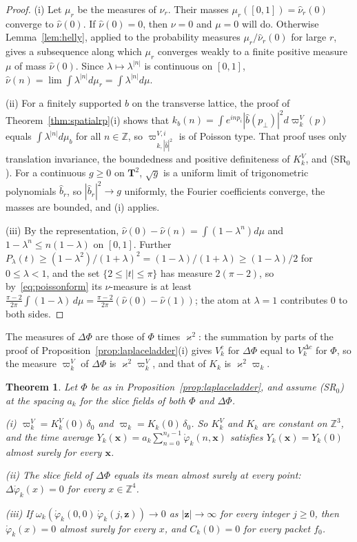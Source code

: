 \documentclass[aps,prd,twocolumn,superscriptaddress,nofootinbib,longbibliography,floatfix,amsmath,amssymb,10pt]{revtex4-2}
\newtheorem{theorem}{Theorem}
\theoremstyle{definition}
\theoremstyle{remark}
\newcommand{\Z}{\mathbb{Z}}
\begin{document}
\begin{proof}
(i) Let $\mu_r$ be the measures of $\nu_r$. Their masses $\mu_r([0,1])=
\hat\nu_r(0)$ converge to $\hat\nu(0)$. If $\hat\nu(0)=0$, then $\nu=0$ and
$\mu=0$ will do. Otherwise Lemma~\ref{lem:helly}, applied to the
probability measures $\mu_r/\hat\nu_r(0)$ for large $r$, gives a subsequence
along which $\mu_r$ converges weakly to a finite positive measure $\mu$ of
mass $\hat\nu(0)$. Since $\lambda\mapsto\lambda^{|n|}$ is continuous on
$[0,1]$, $\hat\nu(n)=\lim\int\lambda^{|n|}d\mu_r=\int\lambda^{|n|}d\mu$.

(ii) For a finitely supported $b$ on the transverse lattice, the proof of
Theorem~\ref{thm:spatialrp}(i) shows that $k_b(n)=\int e^{inp_i}|\hat
b(p_\perp)|^2d\varpi^V_k(p)$ equals $\int\lambda^{|n|}d\mu_b$ for all
$n\in\Z$, so $\varpi^{V,i}_{k,|\hat b|^2}$ is of Poisson type. That proof uses
only translation invariance, the boundedness and positive definiteness of
$K^V_k$, and (SR$_0$). For a continuous $g\ge0$ on $\mathbf T^2$, $\sqrt g$
is a uniform limit of trigonometric polynomials $\hat b_r$, so $|\hat
b_r|^2\to g$ uniformly, the Fourier coefficients converge, the masses are
bounded, and (i) applies.

(iii) By the representation, $\hat\nu(0)-\hat\nu(n)=\int(1-\lambda^n)d\mu$
and $1-\lambda^n\le n(1-\lambda)$ on $[0,1]$. Further $P_\lambda(t)\ge
(1-\lambda^2)/(1+\lambda)^2=(1-\lambda)/(1+\lambda)\ge(1-\lambda)/2$ for
$0\le\lambda<1$, and the set $\{2\le|t|\le\pi\}$ has measure $2(\pi-2)$, so
by~\eqref{eq:poissonform} its $\nu$-measure is at least
$\frac{\pi-2}{2\pi}\int(1-\lambda)\,d\mu=\frac{\pi-2}{2\pi}(\hat\nu(0)-
\hat\nu(1))$; the atom at $\lambda=1$ contributes $0$ to both sides.
\end{proof}

The measures of $\Delta\Phi$ are those of $\Phi$ times $\varkappa^2$: the
summation by parts of the proof of Proposition~\ref{prop:laplaceladder}(i)
gives $V^c_k$ for $\Delta\Phi$ equal to $V^{\Delta c}_k$ for $\Phi$, so the
measure $\varpi^V_k$ of $\Delta\Phi$ is $\varkappa^2\varpi^V_k$, and that of
$K_k$ is $\varkappa^2\varpi_k$.

\begin{theorem}\label{thm:srladder}
Let $\Phi$ be as in Proposition~\textup{\ref{prop:laplaceladder}}, and
assume \textup{(SR$_0$)} at the spacing $a_k$ for the slice fields of both
$\Phi$ and $\Delta\Phi$.

\textup{(i)} $\varpi^V_k=K^V_k(0)\,\delta_0$ and $\varpi_k=K_k(0)\,\delta_0$.
So $K^V_k$ and $K_k$ are constant on $\Z^3$, and the time average
$Y_k(\mathbf x)=a_k\sum_{n=0}^{n_\delta-1}\mathring\varphi_k(n,\mathbf x)$
satisfies $Y_k(\mathbf x)=Y_k(0)$ almost surely for every $\mathbf x$.

\textup{(ii)} The slice field of $\Delta\Phi$ equals its mean almost
surely at every point: $\Delta\mathring\varphi_k(x)=0$ for every
$x\in\Z^4$.

\textup{(iii)} If $\omega_k(\mathring\varphi_k(0,0)\,\mathring\varphi_k(j,
\mathbf z))\to0$ as $|\mathbf z|\to\infty$ for every integer $j\ge0$, then
$\mathring\varphi_k(x)=0$ almost surely for every $x$, and $C_k(0)=0$ for
every packet $f_0$.
\end{theorem}
\end{document}
